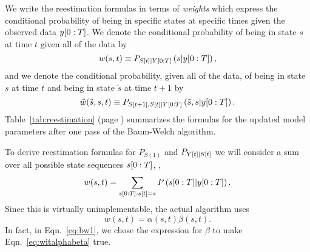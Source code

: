 We write the reestimation formulas in terms of \emph{weights} which
express the conditional probability of being in specific states at
specific times given the observed data $y[0:T]$.  We denote the
conditional probability of being in state $s$ at time $t$ given all of
the data by
\begin{equation}
  \label{eq:wit}
  w(s,t) \equiv P_{{S}{[t]}|Y[0:T]} \left(s|y[0:T]
  \right),
\end{equation}
and we denote the conditional probability, given all of the data, of
being in state $s$ at time $t$ and being in state ${\tilde s}$ at time
$t+1$ by
\begin{equation}
  \label{eq:wijt}
  {\tilde w}({\tilde s},s,t) \equiv P_{{S}{[t+1]},{S}{[t]}|Y[0:T]}
  \left({\tilde s},s|y[0:T] \right).
\end{equation}
Table~\ref{tab:reestimation} (page \pageref{tab:reestimation})
summarizes the formulas for the updated model parameters after one
pass of the Baum-Welch algorithm.

To derive reestimation formulas for $P_{S(1)}$ and
$P_{{Y}{[t]}|{S}{[t]}}$ we will consider a sum over all possible
state sequences $s[0:T]$, \ie,
\begin{equation}
  \label{eq:witFFE}
  w(s,t) = \sum_{s[0:T]:{s}{[t]}=s}
  P \left(s[0:T]|y[0:T]
  \right).
\end{equation}
Since this is virtually unimplementable, the actual algorithm uses
\begin{equation}
  \label{eq:witalphabeta}
  w(s,t) = \alpha(s,t) \beta(s,t).
\end{equation}
In fact, in Eqn.~\eqref{eq:bw1}, we chose the expression for $\beta$
to make Eqn.~\eqref{eq:witalphabeta} true.

